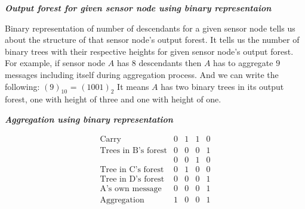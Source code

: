 	\textit{\textbf{Output forest for given sensor node using binary representaion}}

	Binary representation of number of descendants for a given sensor node tells us about the structure of that sensor node's output forest. 
	It tells us the number of binary trees with their respective heights for given sensor node's output forest.
	For example, if sensor node $A$ has $8$ descendants then $A$ has to aggregate $9$ messages including itself during aggregation process.
	And we can write the following:	$(9)_{10}$ = $(1001)_{2}$ 
	It means $A$ has two binary trees in its output forest, one with height of three and one with height of one.

	\textit{\textbf{ Aggregation using binary representation}}

	\[ 
		\begin{array}{lcccc}
			\mbox{Carry} & 0 & 1 & 1 & 0\\
			\hline
			\mbox{Trees in B's forest} & 0 & 0 & 0 & 1 \\
			\mbox{ } & 0 & 0 & 1 & 0 \\
			\hline
			\mbox{Tree in C's forest} & 0 & 1 & 0 & 0 \\
			\hline
			\mbox{Tree in D's forest} & 0 & 0 & 0 & 1 \\
			\hline
			\mbox{A's own message} & 0 & 0 & 0 & 1 \\
			\hline
			\mbox{Aggregation} & 1 & 0 & 0 & 1 
		\end{array}
	\] 


